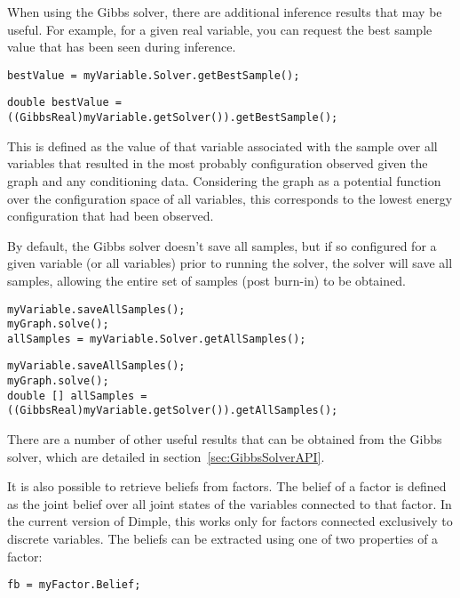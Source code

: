 When using the Gibbs solver, there are additional inference results that may be useful.  For example, for a given real variable, you can request the best sample value that has been seen during inference.

\ifmatlab
\begin{lstlisting}
bestValue = myVariable.Solver.getBestSample();
\end{lstlisting}
\fi

\ifjava
\begin{lstlisting}
double bestValue = ((GibbsReal)myVariable.getSolver()).getBestSample();
\end{lstlisting}
\fi

This is defined as the value of that variable associated with the sample over all variables that resulted in the most probably configuration observed given the graph and any conditioning data. Considering the graph as a potential function over the configuration space of all variables, this corresponds to the lowest energy configuration that had been observed.

By default, the Gibbs solver doesn't save all samples, but if so configured for a given variable (or all variables) prior to running the solver, the solver will save all samples, allowing the entire set of samples (post burn-in) to be obtained.

\ifmatlab
\begin{lstlisting}
myVariable.saveAllSamples();
myGraph.solve();
allSamples = myVariable.Solver.getAllSamples();
\end{lstlisting}
\fi

\ifjava
\begin{lstlisting}
myVariable.saveAllSamples();
myGraph.solve();
double [] allSamples = ((GibbsReal)myVariable.getSolver()).getAllSamples();
\end{lstlisting}
\fi

There are a number of other useful results that can be obtained from the Gibbs solver, which are detailed in section~\ref{sec:GibbsSolverAPI}.

It is also possible to retrieve beliefs from factors.  The belief of a factor is defined as the joint belief over all joint states of the variables connected to that factor.  In the current version of Dimple, this works only for factors connected exclusively to discrete variables.  The beliefs can be extracted using one of two properties of a factor:

\ifmatlab
\begin{lstlisting}
fb = myFactor.Belief;
\end{lstlisting}
\fi



